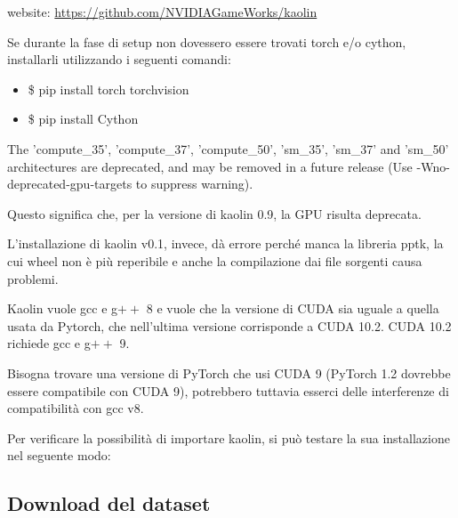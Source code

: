 website: \url{https://github.com/NVIDIAGameWorks/kaolin}

\medskip

Se durante la fase di setup non dovessero essere trovati torch e/o cython, installarli utilizzando i seguenti comandi:

\medskip

\begin{itemize}
\item \$ pip install torch torchvision
\item \$ pip install Cython
\end{itemize}



\medskip



 The 'compute\_35', 'compute\_37', 'compute\_50', 'sm\_35', 
'sm\_37' and 'sm\_50' architectures are deprecated, 
and may be removed in a future release (Use -Wno-deprecated-gpu-targets to suppress warning).



\medskip

Questo significa che, per la versione di kaolin 0.9, la GPU risulta deprecata.

\medskip

L’installazione di kaolin v0.1, invece, dà errore perché manca la libreria pptk, la cui wheel non è più reperibile e anche la compilazione dai file sorgenti causa problemi.

\medskip

Kaolin vuole gcc e g$++$ 8 e vuole che la versione di CUDA sia uguale a quella usata da Pytorch, che nell’ultima versione corrisponde a CUDA 10.2.
CUDA 10.2 richiede  gcc e g$++$ 9.

\medskip

Bisogna trovare una versione di PyTorch che usi CUDA 9 (PyTorch 1.2 dovrebbe essere compatibile con CUDA 9), potrebbero tuttavia esserci delle interferenze di compatibilità con gcc v8.

\medskip

Per verificare la possibilità di importare kaolin, si può testare la sua installazione nel seguente modo:

\medskip






\newpage

\subsection{Download del dataset}

